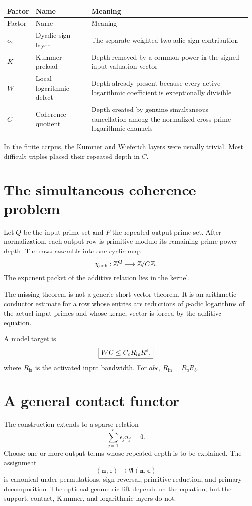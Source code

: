 \begin{longtable}{L{0.14\textwidth}L{0.28\textwidth}L{0.48\textwidth}}
\toprule
Factor & Name & Meaning\\
\midrule
\endfirsthead
\toprule
Factor & Name & Meaning\\
\midrule
\endhead
$\epsilon_2$ & Dyadic sign layer & The separate weighted two-adic sign contribution\\
$K$ & Kummer preload & Depth removed by a common power in the signed input valuation vector\\
$W$ & Local logarithmic defect & Depth already present because every active logarithmic coefficient is exceptionally divisible\\
$C$ & Coherence quotient & Depth created by genuine simultaneous cancellation among the normalized cross-prime logarithmic channels\\
\bottomrule
\end{longtable}

In the finite corpus, the Kummer and Wieferich layers were usually trivial. Most difficult triples placed their repeated depth in $C$.

\section{The simultaneous coherence problem}
Let $Q$ be the input prime set and $P$ the repeated output prime set. After normalization, each output row is primitive modulo its remaining prime-power depth. The rows assemble into one cyclic map
\[
\chi_{\mathrm{coh}}:\mathbb Z^Q\longrightarrow\mathbb Z/C\mathbb Z.
\]
The exponent packet of the additive relation lies in the kernel.

The missing theorem is not a generic short-vector theorem. It is an arithmetic conductor estimate for a row whose entries are reductions of $p$-adic logarithms of the actual input primes and whose kernel vector is forced by the additive equation.

A model target is
\[
\boxed{
WC
\le
C_\varepsilon
R_{\mathrm{in}}R^\varepsilon,
}
\]
where $R_{\mathrm{in}}$ is the activated input bandwidth. For $abc$, $R_{\mathrm{in}}=R_aR_b$.

\section{A general contact functor}
The construction extends to a sparse relation
\[
\sum_{j=1}^{r}\epsilon_jn_j=0.
\]
Choose one or more output terms whose repeated depth is to be explained. The assignment
\[
(\mathbf n,\boldsymbol\epsilon)
\longmapsto
\mathfrak A(\mathbf n,\boldsymbol\epsilon)
\]
is canonical under permutations, sign reversal, primitive reduction, and primary decomposition. The optional geometric lift depends on the equation, but the support, contact, Kummer, and logarithmic layers do not.

